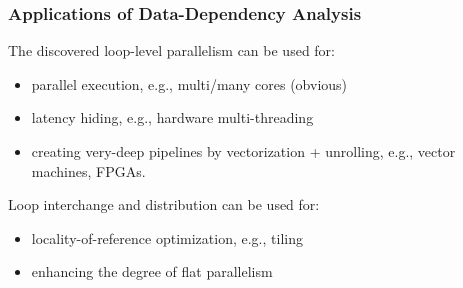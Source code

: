 \documentclass[rgb,dvipsnames]{beamer}
\newcommand{\emp}[1]{\textcolor{DikuRed}{ #1}}
\newcommand{\emphh}[1]{\textcolor{CosGreen}{ #1}}
\newcommand{\mymath}[1]{$ #1 $}
\begin{document}
%
%
%
%
%
%
%
%

\begin{frame}[fragile,t]
  \frametitle{Applications of Data-Dependency Analysis}

\emphh{The discovered loop-level parallelism can be used for:}
\begin{itemize}
    \item parallel execution, e.g., multi/many cores (obvious)\medskip
    \item latency hiding, e.g., hardware multi-threading\medskip
    \item creating very-deep pipelines by vectorization + unrolling, 
            e.g., vector machines, FPGAs.\medskip
\end{itemize}\bigskip

\emphh{Loop interchange and distribution can be used for:}
\begin{itemize}
    \item locality-of-reference optimization, e.g., tiling
    \item enhancing the degree of flat parallelism
\end{itemize}

\end{frame}
\end{document}
